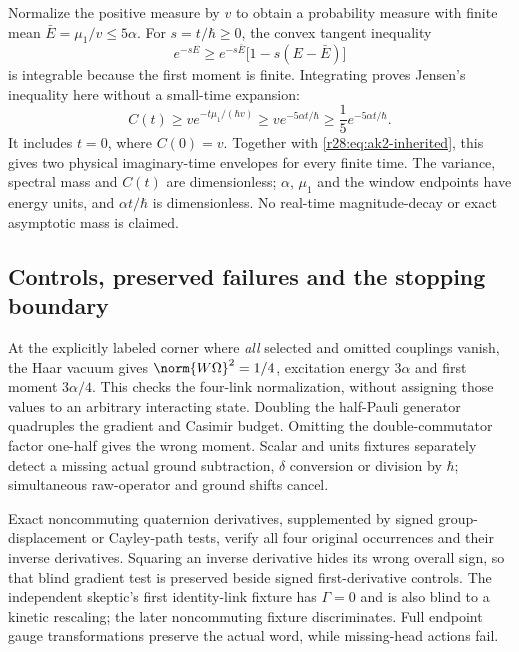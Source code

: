 Normalize the positive measure by $v$ to obtain a probability measure with finite mean $\bar E=\mu_1/v\le5\alpha$. For $s=t/\hbar\ge0$, the convex tangent inequality
\begin{equation}
 e^{-sE}\ge e^{-s\bar E}\bigl[1-s(E-\bar E)\bigr]
\end{equation}
is integrable because the first moment is finite. Integrating proves Jensen's inequality here without a small-time expansion:
\begin{equation}
 C(t)\ge v e^{-t\mu_1/(\hbar v)}
       \ge v e^{-5\alpha t/\hbar}
       \ge\frac15e^{-5\alpha t/\hbar}.
 \label{r28:eq:ak2-jensen}
\end{equation}
It includes $t=0$, where $C(0)=v$. Together with \eqref{r28:eq:ak2-inherited}, this gives two physical imaginary-time envelopes for every finite time. The variance, spectral mass and $C(t)$ are dimensionless; $\alpha$, $\mu_1$ and the window endpoints have energy units, and $\alpha t/\hbar$ is dimensionless. No real-time magnitude-decay or exact asymptotic mass is claimed.

\subsection{Controls, preserved failures and the stopping boundary}
At the explicitly labeled corner where \emph{all} selected and omitted couplings vanish, the Haar vacuum gives $\norm{W\Omega}^2=1/4$, excitation energy $3\alpha$ and first moment $3\alpha/4$. This checks the four-link normalization, without assigning those values to an arbitrary interacting state. Doubling the half-Pauli generator quadruples the gradient and Casimir budget. Omitting the double-commutator factor one-half gives the wrong moment. Scalar and units fixtures separately detect a missing actual ground subtraction, $\delta$ conversion or division by $\hbar$; simultaneous raw-operator and ground shifts cancel.

Exact noncommuting quaternion derivatives, supplemented by signed group-displacement or Cayley-path tests, verify all four original occurrences and their inverse derivatives. Squaring an inverse derivative hides its wrong overall sign, so that blind gradient test is preserved beside signed first-derivative controls. The independent skeptic's first identity-link fixture has $\Gamma=0$ and is also blind to a kinetic rescaling; the later noncommuting fixture discriminates. Full endpoint gauge transformations preserve the actual word, while missing-head actions fail.

